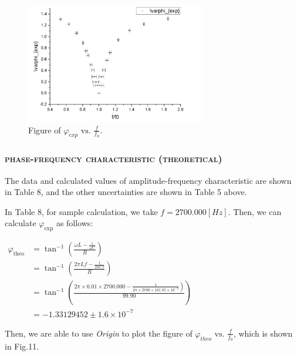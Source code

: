 \documentclass[a4paper,12pt]{article}
\begin{document}
\newpage
\begin{figure}[htb] 
    \centering
    \includegraphics[width=0.7\textwidth]{o2} 
    \caption{Figure of $\varphi_{exp} \text { vs. } \frac{f}{f_{0}}$.} 
\end{figure}

\subsubsection{\textsc{phase-frequency characteristic (theoretical)}}
The data and calculated values of amplitude-frequency characteristic are shown in Table 8, and the other uncertainties are shown in Table 5 above.

In Table 8, for sample calculation, we take $f = 2700.000[Hz] $. Then, we can calculate $\varphi_{\exp }$ as follows:

\begin{center}
$\begin{aligned} \varphi_{\text {theo}} &=\tan ^{-1}\left(\frac{\omega L-\frac{1}{\omega C}}{R}\right)\\ 
&=\tan ^{-1}\left(\frac{2 \pi L f-\frac{1}{2 \pi C f}}{R}\right) \\ 
	&=\tan ^{-1}\left(\frac{\left.2 \pi \times 0.01 \times 2700.000-\frac{1}{2 \pi \times 2700 \times 101.85 \times 10^{-9}}\right)}{99.90}\right) \\ &=-1.33129452 \pm 1.6 \times 10^{-7} \end{aligned}$
\end{center}

Then, we are able to use \textit{Origin} to plot the figure of $\displaystyle \varphi_{theo} \text { vs. } \frac{f}{f_{0}}$, which is shown in Fig.11.
\end{document}
